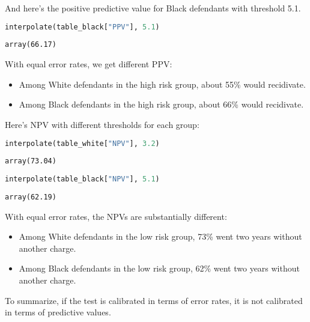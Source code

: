 And here's the positive predictive value for Black defendants with
threshold 5.1.

\begin{lstlisting}[language=Python,style=source]
interpolate(table_black["PPV"], 5.1)
\end{lstlisting}

\begin{lstlisting}[style=output]
array(66.17)
\end{lstlisting}

With equal error rates, we get different PPV:

\begin{itemize}
\item
  Among White defendants in the high risk group, about 55\% would
  recidivate.
\item
  Among Black defendants in the high risk group, about 66\% would
  recidivate.
\end{itemize}

Here's NPV with different thresholds for each group:

\begin{lstlisting}[language=Python,style=source]
interpolate(table_white["NPV"], 3.2)
\end{lstlisting}

\begin{lstlisting}[style=output]
array(73.04)
\end{lstlisting}

\begin{lstlisting}[language=Python,style=source]
interpolate(table_black["NPV"], 5.1)
\end{lstlisting}

\begin{lstlisting}[style=output]
array(62.19)
\end{lstlisting}

With equal error rates, the NPVs are substantially different:

\begin{itemize}
\item
  Among White defendants in the low risk group, 73\% went two years
  without another charge.
\item
  Among Black defendants in the low risk group, 62\% went two years
  without another charge.
\end{itemize}

To summarize, if the test is calibrated in terms of error rates, it is
not calibrated in terms of predictive values.

